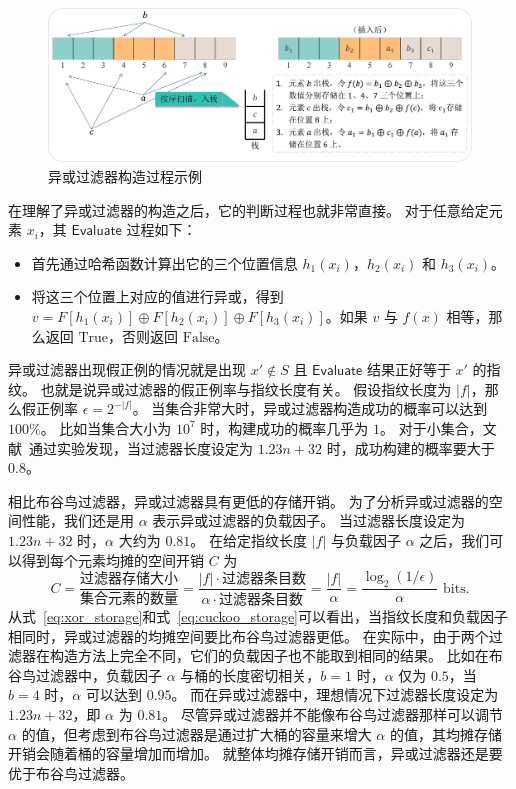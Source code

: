 \begin{figure}[ht]
  \centering
  \includegraphics[width=\textwidth]{figures/xor_exp.pdf}
  \caption{异或过滤器构造过程示例}
  \label{fig:xor_construc}
\end{figure}


在理解了异或过滤器的构造之后，它的判断过程也就非常直接。
对于任意给定元素 $x_i$，其 $\mathsf{Evaluate}$ 过程如下：
\begin{itemize}
  \item 首先通过哈希函数计算出它的三个位置信息 $h_1(x_i)$，$h_2(x_i)$ 和 $h_3(x_i)$。
  \item 将这三个位置上对应的值进行异或，得到 $v = F[h_1(x_i)] \oplus F[h_2(x_i)] \oplus F[h_3(x_i)]$。如果 $v$ 与 $f(x)$ 相等，那么返回 $\mbox{True}$，否则返回 $\mbox{False}$。
\end{itemize}

异或过滤器出现假正例的情况就是出现 $x'\notin S$ 且 $\mathsf{Evaluate}$ 结果正好等于 $x'$ 的指纹。
也就是说异或过滤器的假正例率与指纹长度有关。
假设指纹长度为 $|f|$，那么假正例率 $\epsilon = 2^{-|f|}$。
当集合非常大时，异或过滤器构造成功的概率可以达到 $100\%$。
比如当集合大小为 $10^7$ 时，构建成功的概率几乎为 $1$。
对于小集合，文献~\cite{graf2020xor}通过实验发现，当过滤器长度设定为 $1.23 n + 32$ 时，成功构建的概率要大于 $0.8$。

相比布谷鸟过滤器，异或过滤器具有更低的存储开销。
为了分析异或过滤器的空间性能，我们还是用 $\alpha$ 表示异或过滤器的负载因子。
当过滤器长度设定为 $1.23n + 32$ 时，$\alpha$ 大约为 $0.81$。
在给定指纹长度 $|f|$ 与负载因子 $\alpha$ 之后，我们可以得到每个元素均摊的空间开销 $C$ 为
\begin{equation}
  C = \frac{\mbox{过滤器存储大小}}{\mbox{集合元素的数量}} = \frac{|f| \cdot \mbox{过滤器条目数}}{\alpha \cdot \mbox{过滤器条目数}} = \frac{|f|}{\alpha} = \frac{\log_2(1/\epsilon)}{\alpha} \mbox{ bits}.
  \label{eq:xor_storage}
\end{equation}
从式~\ref{eq:xor_storage}和式~\ref{eq:cuckoo_storage}可以看出，当指纹长度和负载因子相同时，异或过滤器的均摊空间要比布谷鸟过滤器更低。
在实际中，由于两个过滤器在构造方法上完全不同，它们的负载因子也不能取到相同的结果。
比如在布谷鸟过滤器中，负载因子 $\alpha$ 与桶的长度密切相关，$b=1$ 时，$\alpha$ 仅为 $0.5$，当 $b=4$ 时，$\alpha$ 可以达到 $0.95$。
而在异或过滤器中，理想情况下过滤器长度设定为 $1.23n + 32$，即 $\alpha$ 为 $0.81$。
尽管异或过滤器并不能像布谷鸟过滤器那样可以调节 $\alpha$ 的值，但考虑到布谷鸟过滤器是通过扩大桶的容量来增大 $\alpha$ 的值，其均摊存储开销会随着桶的容量增加而增加。
就整体均摊存储开销而言，异或过滤器还是要优于布谷鸟过滤器。

